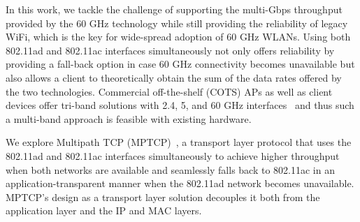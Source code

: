 In this work, we tackle the challenge of supporting the multi-Gbps
throughput provided by the 60 GHz technology while still providing
the reliability of legacy WiFi, which is the key for wide-spread adoption of 60 GHz WLANs.
Using both 802.11ad and
802.11ac interfaces simultaneously not only offers reliability by
providing a fall-back option in case 60 GHz connectivity
becomes unavailable but also allows a client to theoretically obtain
the sum of the data rates offered by the two technologies. 
Commercial off-the-shelf (COTS)
APs as well as client devices offer tri-band solutions with 2.4, 5, and 60 GHz
interfaces~\cite{talon,netgear-x10} and thus such a multi-band approach is
feasible with existing hardware.


We explore Multipath TCP (MPTCP)~\cite{ford:rfc6824}, a
transport layer protocol that uses the 802.11ad and 802.11ac interfaces simultaneously to 
achieve higher throughput when both networks are available and seamlessly falls back to 
802.11ac in an application-transparent manner when the 802.11ad network becomes unavailable. 
MPTCP's design as a transport layer solution
decouples it both from the
application layer and the IP and MAC layers.
\begin{comment}
In contrast, solutions that try to achieve
a similar functionality at the MAC or lower layers, such as 802.11ad's
Fast Session Transfer (FST)~\cite{80211ad}, are invariably tied to the
802.11 specifications and hence are not future proof. More
importantly, MPTCP by design provides the same guarantees to
applications as single-path TCP (SPTCP) in terms of packet delivery and
includes mechanisms to deal with issues such as packet re-ordering
among different interfaces that would otherwise need to be
addressed by any solution implemented at lower layers of the stack,
thus avoiding an unnecessary duplication of functionality.
\end{comment}

